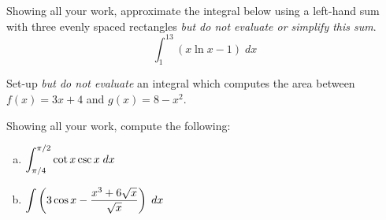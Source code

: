 \documentclass[12pt,letterpaper]{exam}
\begin{document}
\begin{questions}
\newpage
\question[15] Showing all your work, approximate the integral below using a left-hand sum with three evenly spaced rectangles \textit{but do not evaluate or simplify this sum}.
	\[
	\int_1^{13} \left( x \ln x - 1 \right) \;dx
	\]



\newpage
\question[10] Set-up \textit{but do not evaluate} an integral which computes the area between $f(x)= 3x + 4$ and $g(x)= 8 - x^2$.



\newpage
\question[10] Showing all your work, compute the following: \par\vspace{0.3cm}
	\begin{enumerate}[(a)]
	\item $\displaystyle\int_{\pi/4}^{\pi/2} \cot x \csc x \;dx$ \vfill
	\item $\displaystyle\int \left( 3 \cos x - \dfrac{x^3 + 6\sqrt{x}}{\sqrt{x}} \right) \;dx$ \vfill
	\end{enumerate}


\end{questions}
\end{document}
